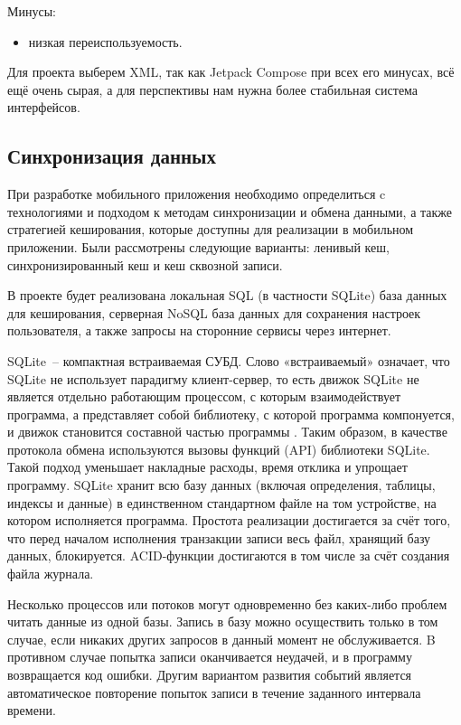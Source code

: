 Минусы:
\begin{itemize}
 \item низкая переиспользуемость.
\end{itemize}

Для проекта выберем XML, так как Jetpack Compose при всех его минусах, всё ещё очень сырая, а для перспективы нам нужна более стабильная система интерфейсов.

\subsection{Синхронизация данных}
При разработке мобильного приложения необходимо определиться c технологиями и подходом к методам синхронизации и обмена данными, а также стратегией кеширования, которые доступны для реализации в мобильном приложении. Были рассмотрены следующие варианты: ленивый кеш, синхронизированный кеш и кеш сквозной записи. 
 
В проекте будет реализована локальная SQL (в частности SQLite) база данных для кеширования, серверная NoSQL база данных для сохранения настроек пользователя, а также запросы на сторонние сервисы через интернет.

SQLite~-- компактная встраиваемая СУБД. Слово «встраиваемый» означает, что SQLite не использует парадигму клиент-сервер, то есть движок SQLite не является отдельно работающим процессом, с которым взаимодействует программа, а представляет собой библиотеку, с которой программа компонуется, и движок становится составной частью программы \cite{sqlite1}. Таким образом, в качестве протокола обмена используются вызовы функций (API) библиотеки SQLite. Такой подход уменьшает накладные расходы, время отклика и упрощает программу. SQLite хранит всю базу данных (включая определения, таблицы, индексы и данные) в единственном стандартном файле на том устройстве, на котором исполняется программа. Простота реализации достигается за счёт того, что перед началом исполнения транзакции записи весь файл, хранящий базу данных, блокируется. ACID-функции достигаются в том числе за счёт создания файла журнала.

Несколько процессов или потоков могут одновременно без каких-либо проблем читать данные из одной базы. Запись в базу можно осуществить только в том случае, если никаких других запросов в данный момент не обслуживается. B противном случае попытка записи оканчивается неудачей, и в программу возвращается код ошибки. Другим вариантом развития событий является автоматическое повторение попыток записи в течение заданного интервала времени.

